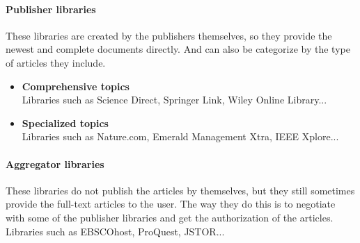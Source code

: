 \paragraph{Publisher libraries}
	These libraries are created by the publishers themselves, so they provide the newest and complete documents directly. And can also be categorize by the type of articles they include.
	\begin{itemize}
		\item\textbf{Comprehensive topics}\\Libraries such as Science Direct, Springer Link, Wiley Online Library...
		\item\textbf{Specialized topics}\\Libraries such as Nature.com, Emerald Management Xtra, IEEE Xplore...
	\end{itemize}
	
\paragraph{Aggregator libraries}
	These libraries do not publish the articles by themselves, but they still sometimes provide the full-text articles to the user. The way they do this is to negotiate with some of the publisher libraries and get the authorization of the articles. Libraries such as EBSCOhost, ProQuest, JSTOR...

